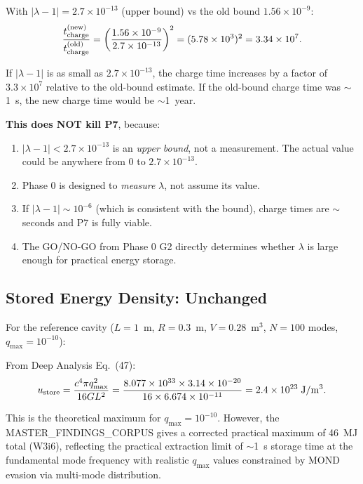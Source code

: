 \documentclass[11pt]{article}
\newcommand{\ee}[1]{\times 10^{#1}}
\newcommand{\lambdaone}{|\lambda-1|}
\begin{document}
With $\lambdaone = 2.7\ee{-13}$ (upper bound) vs the old bound
$1.56\ee{-9}$:
\begin{equation}
\frac{t_{\rm charge}^{\rm (new)}}{t_{\rm charge}^{\rm (old)}}
= \left(\frac{1.56\ee{-9}}{2.7\ee{-13}}\right)^2
= (5.78\ee{3})^2 = 3.34\ee{7}.
\end{equation}

\begin{tcolorbox}[colback=red!5!white, colframe=red!70!black,
  title=\textbf{CRITICAL: Charge Time Blowup}]
If $\lambdaone$ is as small as $2.7\ee{-13}$, the charge time
increases by a factor of $3.3\ee{7}$ relative to the old-bound estimate.
If the old-bound charge time was $\sim$1~s, the new charge time would
be $\sim$1~year.

\textbf{This does NOT kill P7}, because:
\begin{enumerate}
\item $\lambdaone < 2.7\ee{-13}$ is an \emph{upper bound}, not a
  measurement. The actual value could be anywhere from 0 to $2.7\ee{-13}$.
\item Phase 0 is designed to \emph{measure} $\lambda$, not assume
  its value.
\item If $\lambdaone \sim 10^{-6}$ (which is consistent with the
  bound), charge times are $\sim$seconds and P7 is fully viable.
\item The GO/NO-GO from Phase 0 G2 directly determines whether
  $\lambda$ is large enough for practical energy storage.
\end{enumerate}
\end{tcolorbox}

\subsection{Stored Energy Density: Unchanged}

For the reference cavity ($L = 1$~m, $R = 0.3$~m, $V = 0.28$~m$^3$,
$N = 100$ modes, $q_{\max} = 10^{-10}$):

From Deep Analysis Eq.~(47):
\begin{equation}
u_{\rm store} = \frac{c^4 \pi q_{\max}^2}{16 G L^2}
= \frac{8.077\ee{33} \times 3.14 \times 10^{-20}}{16 \times 6.674\ee{-11}}
= 2.4\ee{23}\;\mathrm{J/m^3}.
\end{equation}

This is the theoretical maximum for $q_{\max} = 10^{-10}$. However,
the MASTER\_FINDINGS\_CORPUS gives a corrected practical maximum of
46~MJ total (W3i6), reflecting the practical extraction limit of
$\sim$1~s storage time at the fundamental mode frequency with realistic
$q_{\max}$ values constrained by MOND evasion via multi-mode distribution.
\end{document}
